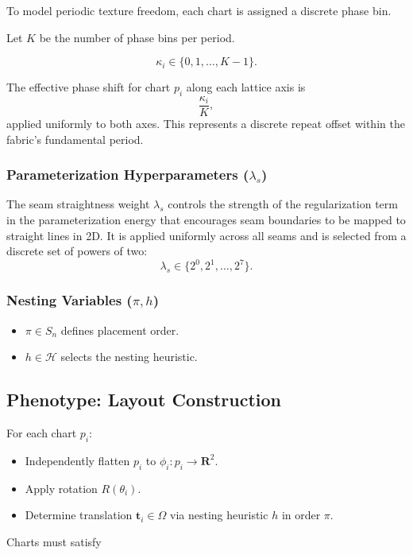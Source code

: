 \documentclass[runningheads]{llncs}
\begin{document}
To model periodic texture freedom, each chart is assigned a discrete phase bin.

Let $K$ be the number of phase bins per period.

\[
\kappa_i \in \{0,1,\dots,K-1\}.
\]

The effective phase shift for chart $p_i$ along each lattice axis is
\[
\frac{\kappa_i}{K},
\]
applied uniformly to both axes.
This represents a discrete repeat offset within the fabric's fundamental period.

\subsubsection{Parameterization Hyperparameters ($\lambda_s$)}

The seam straightness weight $\lambda_s$ controls the strength of the regularization
term in the parameterization energy that encourages seam boundaries to be mapped
to straight lines in 2D.
It is applied uniformly across all seams and is selected from a discrete set
of powers of two:
\[
\lambda_s \in \{2^0, 2^1, \dots, 2^7\}.
\]

\subsubsection{Nesting Variables ($\pi, h$)}

\begin{itemize}
    \item $\pi \in S_n$ defines placement order.
    \item $h \in \mathcal{H}$ selects the nesting heuristic.
\end{itemize}

\subsection{Phenotype: Layout Construction}

For each chart $p_i$:

\begin{itemize}
    \item Independently flatten $p_i$ to $\phi_i: p_i \to \mathbf{R}^2$.
    \item Apply rotation $R(\theta_i)$.
    \item Determine translation $\mathbf{t}_i \in \Omega$ via nesting heuristic $h$ in order $\pi$.
\end{itemize}

Charts must satisfy
\end{document}
